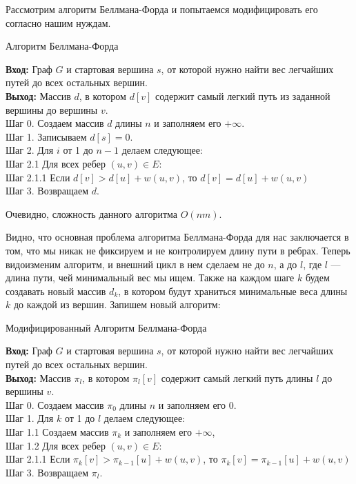 \documentclass[a4paper,12pt]{extarticle}
\theoremstyle{plain} %
\begin{document}
\begin{large}
 Рассмотрим алгоритм Беллмана-Форда и попытаемся модифицировать его согласно нашим нуждам.

\begin{algorithm}[H]
\caption{Алгоритм Беллмана-Форда}
\label{diff_graph_construct}
\textbf{Вход:} Граф $G$ и стартовая вершина $s$, от которой нужно найти вес легчайших путей до всех остальных вершин.\\
\textbf{Выход:} Массив $d$, в котором $d[v]$ содержит самый легкий путь из заданной вершины до вершины $v$.\\
Шаг 0. Создаем массив $d$ длины $n$ и заполняем его $+\infty$. \\
Шаг 1. Записываем $d[s] = 0$.\\
Шаг 2. Для $i$ от 1 до $n-1$ делаем следующее:\\
Шаг 2.1 Для всех ребер $(u, v) \in E:$\\
Шаг 2.1.1 Если $d[v] > d[u] + w(u,v)$, то $d[v] = d[u] + w(u,v)$\\
Шаг 3. Возвращаем $d$.\\
\end{algorithm}

Очевидно, сложность данного алгоритма $O(nm)$.

Видно, что основная проблема алгоритма Беллмана-Форда для нас заключается в том, что мы никак не фиксируем и не контролируем длину пути в ребрах. Теперь видоизменим алгоритм, и внешний цикл в нем сделаем не до $n$, а до $l$, где $l$ --- длина пути, чей минимальный вес мы ищем. Также на каждом шаге $k$ будем создавать новый массив $d_k$, в котором будут храниться минимальные веса длины $k$ до каждой из вершин. Запишем новый алгоритм:

\begin{algorithm}[H]
\caption{Модифицированный Алгоритм Беллмана-Форда}
\label{diff_graph_construct}
\textbf{Вход:} Граф $G$ и стартовая вершина $s$, от которой нужно найти вес легчайших путей до всех остальных вершин.\\
\textbf{Выход:} Массив $\pi_l$, в котором $\pi_l[v]$ содержит самый легкий путь длины $l$ до вершины $v$.\\
Шаг 0. Создаем массив $\pi_0$ длины $n$ и заполняем его $0$. \\
Шаг 1. Для $k$ от 1 до $l$ делаем следующее:\\
Шаг 1.1 Создаем массив $\pi_k$ и заполняем его $+\infty$,\\
Шаг 1.2 Для всех ребер $(u, v) \in E:$\\
Шаг 2.1.1 Если $\pi_k[v] > \pi_{k-1}[u] + w(u,v)$, то $\pi_k[v] = \pi_{k-1}[u] + w(u,v)$\\
Шаг 3. Возвращаем $\pi_l$.\\
\end{algorithm}


\end{large}
\end{document}
